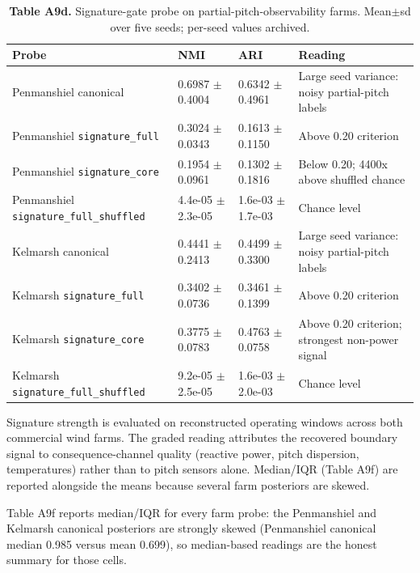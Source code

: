 \documentclass[
  journal]{IEEEtran}
\begin{document}
\begin{table}[!t]
\centering
\fontsize{8.0pt}{9.6pt}\selectfont
\setlength{\tabcolsep}{4pt}
\renewcommand{\arraystretch}{1.05}
\caption*{\textbf{Table A9d.} Signature-gate probe on partial-pitch-observability farms. Mean$\pm$sd over five seeds; per-seed values archived.}
%
\begin{tabular}{llll}
\toprule
Probe & NMI & ARI & Reading \\
\midrule
Penmanshiel canonical & 0.6987 $\pm$ 0.4004 & 0.6342 $\pm$ 0.4961 & Large seed variance: noisy partial-pitch labels \\
Penmanshiel \texttt{signature\_full} & 0.3024 $\pm$ 0.0343 & 0.1613 $\pm$ 0.1150 & Above 0.20 criterion \\
Penmanshiel \texttt{signature\_core} & 0.1954 $\pm$ 0.0961 & 0.1302 $\pm$ 0.1816 & Below 0.20; 4400x above shuffled chance \\
Penmanshiel \texttt{signature\_full\_shuffled} & 4.4e-05 $\pm$ 2.3e-05 & 1.6e-03 $\pm$ 1.7e-03 & Chance level \\
\midrule
Kelmarsh canonical & 0.4441 $\pm$ 0.2413 & 0.4499 $\pm$ 0.3300 & Large seed variance: noisy partial-pitch labels \\
Kelmarsh \texttt{signature\_full} & 0.3402 $\pm$ 0.0736 & 0.3461 $\pm$ 0.1399 & Above 0.20 criterion \\
Kelmarsh \texttt{signature\_core} & 0.3775 $\pm$ 0.0783 & 0.4763 $\pm$ 0.0758 & Above 0.20 criterion; strongest non-power signal \\
Kelmarsh \texttt{signature\_full\_shuffled} & 9.2e-05 $\pm$ 2.5e-05 & 1.6e-03 $\pm$ 2.0e-03 & Chance level \\
\bottomrule
\end{tabular}
\vspace{1mm}
\fontsize{8.0pt}{9.6pt}\selectfont Signature strength is evaluated on reconstructed operating windows across both commercial wind farms. The graded reading attributes the recovered boundary signal to consequence-channel quality (reactive power, pitch dispersion, temperatures) rather than to pitch sensors alone. Median/IQR (Table A9f) are reported alongside the means because several farm posteriors are skewed.
\end{table}

Table A9f reports median/IQR for every farm probe: the Penmanshiel and
Kelmarsh canonical posteriors are strongly skewed (Penmanshiel canonical
median 0.985 versus mean 0.699), so median-based readings are the honest
summary for those cells.
\end{document}
